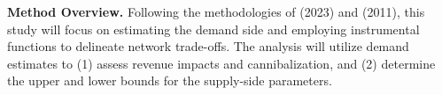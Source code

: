 \documentclass[11pt]{article}
\begin{document}








\textbf{Method Overview.} Following the methodologies of \citeauthor{houde2023nexus} (2023) and \citeauthor{holmes2011diffusion} (2011), this study will focus on estimating the demand side and employing instrumental functions to delineate network trade-offs. The analysis will utilize demand estimates to (1) assess revenue impacts and cannibalization, and (2) determine the upper and lower bounds for the supply-side parameters.
\end{document}
